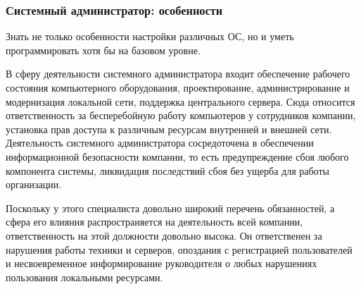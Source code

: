 \documentclass{../industrial-development}
\begin{document}
	\begin{frame} \frametitle{Системный администратор: особенности}
		Знать не только особенности настройки различных ОС, но и уметь программировать хотя бы на базовом уровне.
	\end{frame}

	\lecturenotes
		В сферу деятельности системного администратора входит обеспечение рабочего состояния компьютерного оборудования, проектирование, администрирование и модернизация локальной сети, поддержка центрального сервера. Сюда относится ответственность за бесперебойную работу компьютеров у сотрудников компании, установка прав доступа к различным ресурсам внутренней и внешней сети. Деятельность системного администратора сосредоточена в обеспечении информационной безопасности компании, то есть предупреждение сбоя любого компонента системы, ликвидация последствий сбоя без ущерба для работы организации. 
		
		Поскольку у этого специалиста довольно широкий перечень обязанностей, а сфера его влияния распространяется на деятельность всей компании, ответственность на этой должности довольно высока. Он ответственен за нарушения работы техники и серверов, опоздания с регистрацией пользователей и несвоевременное информирование руководителя о любых нарушениях пользования локальными ресурсами.
	
\end{document}

